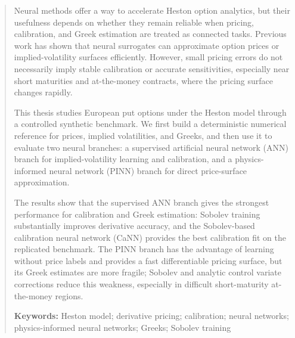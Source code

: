 \documentclass[12pt]{report} %
\begin{document}
\newpage %
\thispagestyle{empty}
\mbox{}

\newpage %
\thispagestyle{empty}
\mbox{}

\renewcommand\abstractname{\large\bfseries\filcenter\uppercase{Summary}}
\begin{abstract}
\thispagestyle{plain}
\setcounter{page}{3}
	Neural methods offer a way to accelerate Heston option analytics, but their usefulness depends on whether they remain reliable when pricing, calibration, and Greek estimation are treated as connected tasks. Previous work has shown that neural surrogates can approximate option prices or implied-volatility surfaces efficiently. However, small pricing errors do not necessarily imply stable calibration or accurate sensitivities, especially near short maturities and at-the-money contracts, where the pricing surface changes rapidly.

	This thesis studies European put options under the Heston model through a controlled synthetic benchmark. We first build a deterministic numerical reference for prices, implied volatilities, and Greeks, and then use it to evaluate two neural branches: a supervised artificial neural network (ANN) branch for implied-volatility learning and calibration, and a physics-informed neural network (PINN) branch for direct price-surface approximation.

	The results show that the supervised ANN branch gives the strongest performance for calibration and Greek estimation: Sobolev training substantially improves derivative accuracy, and the Sobolev-based calibration neural network (CaNN) provides the best calibration fit on the replicated benchmark. The PINN branch has the advantage of learning without price labels and provides a fast differentiable pricing surface, but its Greek estimates are more fragile; Sobolev and analytic control variate corrections reduce this weakness, especially in difficult short-maturity at-the-money regions.
	
		\textbf{Keywords:} Heston model; derivative pricing; calibration; neural networks; physics-informed neural networks; Greeks; Sobolev training
	
	\vfill
\end{abstract}
	\newpage %
	\thispagestyle{empty}
	\mbox{}




\setcounter{page}{5}
	
\end{document}
